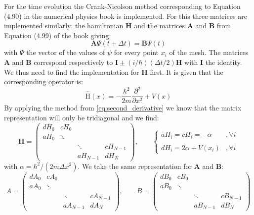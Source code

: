 For the time evolution the Crank-Nicolson method corresponding to Equation (4.90) in the numerical physics book \cite{physnumbook} is implemented. For this three matrices are implemented similarly: the hamiltonian $\mathbf{H}$ and the matrices $\mathbf{A}$ and $\mathbf{B}$ from Equation (4.99) of the book \cite{physnumbook} giving:
\begin{equation}
    \mathbf{A} \Psi(t+\Delta t) = \mathbf{B} \Psi(t)
\end{equation}
with $\Psi$ the vector of the values of $\psi$ for every point $x_i$ of the mesh. The matrices $\mathbf{A}$ and $\mathbf{B}$ correspond respectively to $\mathbf{I} \pm (i/\hbar)(\Delta t/2) \mathbf{H}$ with $\mathbf{I}$ the identity. We thus need to find the implementation for $\mathbf{H}$ first. It is given that the corresponding operator is:
\begin{equation}
    \hat{\mathrm{H}}(x) = -\frac{\hbar^2}{2m}\frac{\partial^2}{\partial x^2} + V(x)
\end{equation}
By applying the method from \autoref{eq:second_derivative} we know that the matrix representation will only be tridiagonal and we find:
\begin{equation}
    \mathbf{H} = \left( \begin{matrix}
        dH_0 & cH_0      &          &   \\
        aH_0 & \ddots    &          &   \\
             &           & \ddots   & cH_{N-1} \\
             &           & aH_{N-1} & dH_N
        \end{matrix} \right)
        , \qquad 
        \begin{cases} aH_i = cH_i = -\alpha &, \forall i \\
        &\\
        dH_i = 2\alpha + V(x_i) &, \forall i
        \end{cases}
        \label{eq:H_matrix}
\end{equation}
with $\alpha = \hbar^2/(2m\Delta x^2)$. We take the same representation for $\mathbf{A}$ and $\mathbf{B}$:
\begin{equation}
    A = \left( \begin{matrix}
        dA_0 & cA_0      &          &   \\
        aA_0 & \ddots    &          &   \\
             &           & \ddots   & cA_{N-1} \\
             &           & aA_{N-1} & dA_N
        \end{matrix} \right)
    ,\qquad
    B = \left( \begin{matrix}
        dB_0 & cB_0      &          &   \\
        aB_0 & \ddots    &          &   \\
             &           & \ddots   & cB_{N-1} \\
             &           & aB_{N-1} & dB_N
        \end{matrix} \right)
\end{equation}

